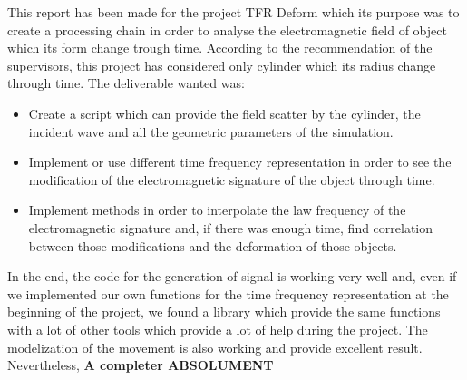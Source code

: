This report has been made for the project TFR Deform which its purpose was to create a processing chain in order to analyse the electromagnetic field of object which its form change trough time. According to the recommendation of the supervisors, this project has considered only cylinder which its radius change through time. The deliverable wanted was:

\medskip

\begin{itemize}
\item Create a script which can provide the field scatter by the cylinder, the incident wave and all the geometric parameters of the simulation.
\item Implement or use different time frequency representation in order to see the modification of the electromagnetic signature of the object through time.
\item Implement methods in order to interpolate the law frequency of the electromagnetic signature and, if there was enough time, find correlation between those modifications and the deformation of those objects.
\end{itemize}

\medskip

In the end, the code for the generation of signal is working very well and, even if we implemented our own functions for the time frequency representation at the beginning of the project, we found a library which provide the same functions with a lot of other tools which provide a lot of help during the project. The modelization of the movement is also working and provide excellent result. Nevertheless, \textbf{A completer ABSOLUMENT}
